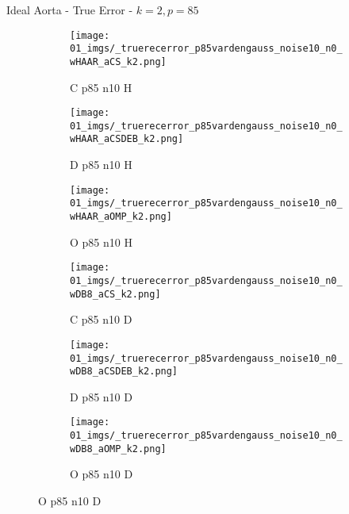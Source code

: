 \begin{frame}{Ideal Aorta - True Error - $k=2,p=85$}{}
\begin{figure}
\begin{subfigure}{0.13\textwidth}
\texttt{[image: 01\_imgs/\_truerecerror\_p85vardengauss\_noise10\_n0\_wHAAR\_aCS\_k2.png]}
\caption*{\tiny C p85 n10 H}
\end{subfigure}
\begin{subfigure}{0.13\textwidth}
\texttt{[image: 01\_imgs/\_truerecerror\_p85vardengauss\_noise10\_n0\_wHAAR\_aCSDEB\_k2.png]}
\caption*{\tiny D p85 n10 H}
\end{subfigure}
\begin{subfigure}{0.13\textwidth}
\texttt{[image: 01\_imgs/\_truerecerror\_p85vardengauss\_noise10\_n0\_wHAAR\_aOMP\_k2.png]}
\caption*{\tiny O p85 n10 H}
\end{subfigure}
\begin{subfigure}{0.13\textwidth}
\texttt{[image: 01\_imgs/\_truerecerror\_p85vardengauss\_noise10\_n0\_wDB8\_aCS\_k2.png]}
\caption*{\tiny C p85 n10 D}
\end{subfigure}
\begin{subfigure}{0.13\textwidth}
\texttt{[image: 01\_imgs/\_truerecerror\_p85vardengauss\_noise10\_n0\_wDB8\_aCSDEB\_k2.png]}
\caption*{\tiny D p85 n10 D}
\end{subfigure}
\begin{subfigure}{0.13\textwidth}
\texttt{[image: 01\_imgs/\_truerecerror\_p85vardengauss\_noise10\_n0\_wDB8\_aOMP\_k2.png]}
\caption*{\tiny O p85 n10 D}
\end{subfigure}

\vspace{5pt}


\end{figure}
\end{frame}
